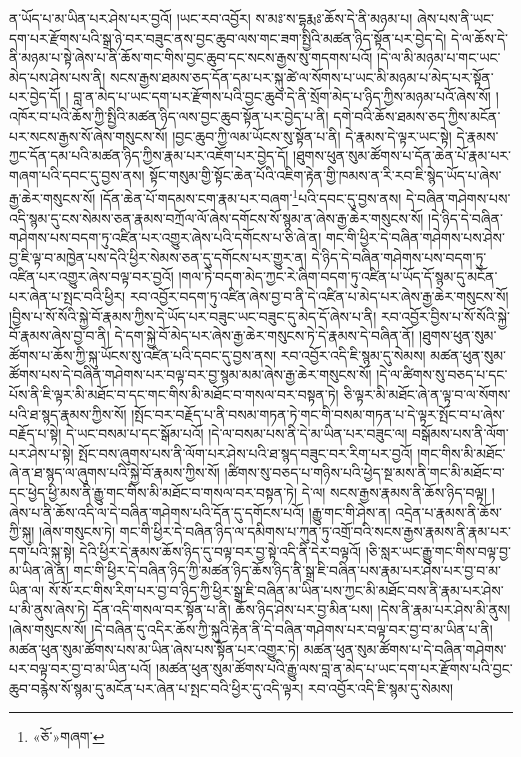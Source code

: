 ན་ཡོད་པ་མ་ཡིན་པར་ཤེས་པར་བྱའོ། །ཡང་རབ་འབྱོར། ས་མཿ་ས་དྷརྨཿ་ཆོས་དེ་ནི་མཉམ་པ། ཞེས་པས་ནི་ཡང་དག་པར་རྫོགས་པའི་སྒྲ་ཉེ་བར་བཟུང་ནས་བྱང་ཆུབ་ལས་གང་ཟག་སྤྱིའི་མཚན་ཉིད་སྟོན་པར་བྱེད་དེ། དེ་ལ་ཆོས་དེ་ནི་མཉམ་པ་སྟེ་ཞེས་པ་ནི་ཆོས་གང་གིས་བྱང་ཆུབ་དང་སངས་རྒྱས་སུ་གདགས་པའོ། །དེ་ལ་མི་མཉམ་པ་གང་ཡང་མེད་པས་ཤེས་པས་ནི། སངས་རྒྱས་ཐམས་ཅད་དོན་དམ་པར་སྐུ་ཚེ་ལ་སོགས་པ་ཡང་མི་མཉམ་པ་མེད་པར་སྟོན་པར་བྱེད་དོ། །
བླ་ན་མེད་པ་ཡང་དག་པར་རྫོགས་པའི་བྱང་ཆུབ་དེ་ནི་སྲོག་མེད་པ་ཉིད་ཀྱིས་མཉམ་པའོ་ཞེས་སོ། །འཁོར་བ་པའི་ཆོས་ཀྱི་སྤྱིའི་མཚན་ཉིད་ལས་བྱང་ཆུབ་སྟོན་པར་བྱེད་པ་ནི། དགེ་བའི་ཆོས་ཐམས་ཅད་ཀྱིས་མངོན་པར་སངས་རྒྱས་སོ་ཞེས་གསུངས་སོ། །བྱང་ཆུབ་ཀྱི་ལམ་ཡོངས་སུ་སྟོན་པ་ནི། དེ་རྣམས་དེ་ལྟར་ཡང་སྟེ། དེ་རྣམས་ཀྱང་དོན་དམ་པའི་མཚན་ཉིད་ཀྱིས་རྣམ་པར་འཇོག་པར་བྱེད་དོ། །ཐུགས་ཕུན་སུམ་ཚོགས་པ་དོན་ཆེན་པོ་རྣམ་པར་གཞག་པའི་དབང་དུ་བྱས་ནས། སྟོང་གསུམ་གྱི་སྟོང་ཆེན་པོའི་འཇིག་རྟེན་གྱི་ཁམས་ན་རི་རབ་ཇི་སྙེད་ཡོད་པ་ཞེས་རྒྱ་ཆེར་གསུངས་སོ། །དོན་ཆེན་པོ་གདམས་ངག་རྣམ་པར་བཞག་\footnote{«ཅོ་»གཞག་}པའི་དབང་དུ་བྱས་ནས། དེ་བཞིན་གཤེགས་པས་འདི་སྙམ་དུ་ངས་སེམས་ཅན་རྣམས་བཀྲོལ་ལོ་ཞེས་དགོངས་སོ་སྙམ་ན་ཞེས་རྒྱ་ཆེར་གསུངས་སོ། །དེ་ཉིད་དེ་བཞིན་གཤེགས་པས་བདག་ཏུ་འཛིན་པར་འགྱུར་ཞེས་པའི་དགོངས་པ་ཅི་ཞེ་ན། གང་གི་ཕྱིར་དེ་བཞིན་གཤེགས་པས་ཤེས་བྱ་ཇི་ལྟ་བ་མཁྱེན་པས་དེའི་ཕྱིར་སེམས་ཅན་དུ་དགོངས་པར་གྱུར་ན། དེ་ཉིད་དེ་བཞིན་གཤེགས་པས་བདག་ཏུ་འཛིན་པར་འགྱུར་ཞེས་བལྟ་བར་བྱའོ། །གལ་ཏེ་བདག་མེད་ཀྱང་རེ་ཞིག་བདག་ཏུ་འཛིན་པ་ཡོད་དོ་སྙམ་དུ་མངོན་པར་ཞེན་པ་སྤང་བའི་ཕྱིར། རབ་འབྱོར་བདག་ཏུ་འཛིན་ཞེས་བྱ་བ་ནི་དེ་འཛིན་པ་མེད་པར་ཞེས་རྒྱ་ཆེར་གསུངས་སོ། །བྱིས་པ་སོ་སོའི་སྐྱེ་བོ་རྣམས་ཀྱིས་དེ་ཡོད་པར་བཟུང་ཡང་བཟུང་དུ་མེད་དོ་ཞེས་པ་ནི། རབ་འབྱོར་བྱིས་པ་སོ་སོའི་སྐྱེ་བོ་རྣམས་ཞེས་བྱ་བ་ནི། དེ་དག་སྐྱེ་བོ་མེད་པར་ཞེས་རྒྱ་ཆེར་གསུངས་ཏེ་དེ་རྣམས་དེ་བཞིན་ནོ། །ཐུགས་ཕུན་སུམ་ཚོགས་པ་ཆོས་ཀྱི་སྐུ་ཡོངས་སུ་འཛིན་པའི་དབང་དུ་བྱས་ནས། རབ་འབྱོར་འདི་ཇི་སྙམ་དུ་སེམས། མཚན་ཕུན་སུམ་ཚོགས་པས་དེ་བཞིན་གཤེགས་པར་བལྟ་བར་བྱ་སྙམ་མམ་ཞེས་རྒྱ་ཆེར་གསུངས་སོ། །དེ་ལ་ཚིགས་སུ་བཅད་པ་དང་པོས་ནི་ཇི་ལྟར་མི་མཐོང་བ་དང་གང་གིས་མི་མཐོང་བ་གསལ་བར་བསྟན་ཏེ། ཅི་ལྟར་མི་མཐོང་ཞེ་ན་ལྟ་བ་ལ་སོགས་པའི་ཐ་སྙད་རྣམས་ཀྱིས་སོ། །སྤོང་བར་བརྗོད་པ་ནི་བསམ་གཏན་ཏེ་གང་གི་བསམ་གཏན་པ་དེ་ལྟར་སྤོང་བ་པ་ཞེས་བརྗོད་པ་སྟེ། དེ་ཡང་བསམ་པ་དང་སྒོམ་པའོ། །དེ་ལ་བསམ་པས་ནི་དེ་མ་ཡིན་པར་བཟུང་ལ། བསྒོམས་པས་ནི་ལོག་པར་ཤེས་པ་སྟེ། སྤོང་བས་ཞུགས་པས་ནི་ལོག་པར་ཤེས་པའི་ཐ་སྙད་བཟུང་བར་རིག་པར་བྱའོ། །གང་གིས་མི་མཐོང་ཞེ་ན་ཐ་སྙད་ལ་ཞུགས་པའི་སྐྱེ་བོ་རྣམས་ཀྱིས་སོ། །ཚིགས་སུ་བཅད་པ་གཉིས་པའི་ཕྱེད་སྔ་མས་ནི་གང་མི་མཐོང་བ་དང་ཕྱེད་ཕྱི་མས་ནི་རྒྱུ་གང་གིས་མི་མཐོང་བ་གསལ་བར་བསྟན་ཏེ། དེ་ལ། སངས་རྒྱས་རྣམས་ནི་ཆོས་ཉིད་བལྟ། །ཞེས་པ་ནི་ཆོས་འདི་ལ་དེ་བཞིན་གཤེགས་པའི་དོན་དུ་དགོངས་པའོ། །རྒྱུ་གང་གི་ཤེས་ན། འདྲེན་པ་རྣམས་ནི་ཆོས་ཀྱི་སྐུ། །ཞེས་གསུངས་ཏེ། གང་གི་ཕྱིར་དེ་བཞིན་ཉིད་ལ་དམིགས་པ་ཀུན་ཏུ་འགྲོ་བའི་སངས་རྒྱས་རྣམས་ནི་རྣམ་པར་དག་པའི་སྐུ་སྟེ། དེའི་ཕྱིར་དེ་རྣམས་ཆོས་ཉིད་དུ་བལྟ་བར་བྱ་སྟེ་འདི་ནི་དེར་བལྟའོ། །ཅི་སླར་ཡང་རྒྱུ་གང་གིས་བལྟ་བྱ་མ་ཡིན་ཞེ་ན། གང་གི་ཕྱིར་དེ་བཞིན་ཉིད་ཀྱི་མཚན་ཉིད་ཆོས་ཉིད་ནི་སྒྲ་ཇི་བཞིན་པས་རྣམ་པར་ཤེས་པར་བྱ་བ་མ་ཡིན་ལ། སོ་སོ་རང་གིས་རིག་པར་བྱ་བ་ཉིད་ཀྱི་ཕྱིར་སྒྲ་ཇི་བཞིན་མ་ཡིན་པས་ཀྱང་མི་མཐོང་བས་ནི་རྣམ་པར་ཤེས་པ་མི་ནུས་ཞེས་ཏེ། དོན་འདི་གསལ་བར་སྟོན་པ་ནི། ཆོས་ཉིད་ཤེས་པར་བྱ་མིན་པས། །དེས་ནི་རྣམ་པར་ཤེས་མི་ནུས། །ཞེས་གསུངས་སོ། །དེ་བཞིན་དུ་འདིར་ཆོས་ཀྱི་སྐུའི་རྟེན་ནི་དེ་བཞིན་གཤེགས་པར་བལྟ་བར་བྱ་བ་མ་ཡིན་པ་ནི། མཚན་ཕུན་སུམ་ཚོགས་པས་མ་ཡིན་ཞེས་པས་སྟོན་པར་འགྱུར་ཏེ། མཚན་ཕུན་སུམ་ཚོགས་པ་དེ་བཞིན་གཤེགས་པར་བལྟ་བར་བྱ་བ་མ་ཡིན་པའོ། །མཚན་ཕུན་སུམ་ཚོགས་པའི་རྒྱུ་ལས་བླ་ན་མེད་པ་ཡང་དག་པར་རྫོགས་པའི་བྱང་ཆུབ་བརྙེས་སོ་སྙམ་དུ་མངོན་པར་ཞེན་པ་སྤང་བའི་ཕྱིར་དུ་འདི་ལྟར། རབ་འབྱོར་འདི་ཇི་སྙམ་དུ་སེམས། 